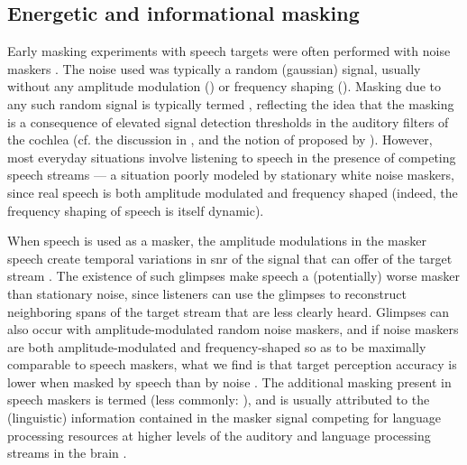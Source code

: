 \subsection{Energetic and informational masking}
Early masking experiments with speech targets were often performed with noise maskers \citep[e.g.,][]{HawkinsStevens1950,Tolhurst1957b,PollackPickett1958}.  The noise used was typically a random (gaussian) signal, usually without any amplitude modulation () or frequency shaping ().  Masking due to any such random signal is typically termed , reflecting the idea that the masking is a consequence of elevated signal detection thresholds in the auditory filters of the cochlea (cf. the discussion in \citealt[96–97]{Moore2008}, and the notion of  proposed by \citealt{DurlachEtAl2003a}).  However, most everyday situations involve listening to speech in the presence of competing speech streams — a situation poorly modeled by stationary white noise maskers, since real speech is both amplitude modulated and frequency shaped (indeed, the frequency shaping of speech is itself dynamic).

When speech is used as a masker, the amplitude modulations in the masker speech create temporal variations in \ac{snr} of the signal that can offer  of the target stream \citep{FestenPlomp1990}.  The existence of such glimpses make speech a (potentially) worse masker than stationary noise, since listeners can use the glimpses to reconstruct neighboring spans of the target stream that are less clearly heard.\footnotemark{}  Glimpses can also occur with amplitude-modulated random noise maskers, and if noise maskers are both amplitude-modulated and frequency-shaped so as to be maximally comparable to speech maskers, what we find is that target perception accuracy is lower when masked by speech than by noise \citep[e.g.,][]{CarhartEtAl1969,LewisEtAl1988,SimpsonCooke2005}.  The additional masking present in speech maskers is termed  (less commonly: ), and is usually attributed to the (linguistic) information contained in the masker signal competing for language processing resources at higher levels of the auditory and language processing streams in the brain \citep{DurlachEtAl2003a,xxx}.

